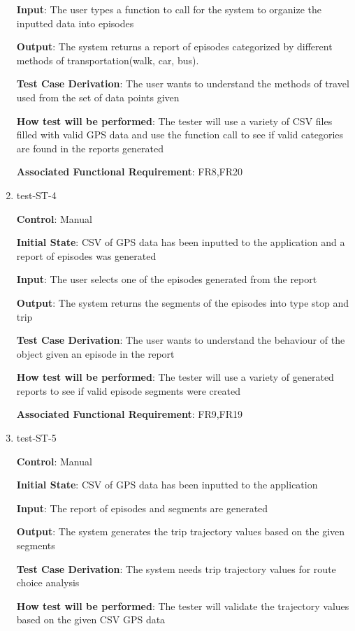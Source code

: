 \documentclass[12pt, titlepage]{article}
\begin{document}
\begin{enumerate}
\textbf{Input}: The user types a function to call for the system to organize the inputted data into episodes 
					
\textbf{Output}: The system returns a report of episodes categorized by different  methods of transportation(walk, car, bus).

\textbf{Test Case Derivation}: The user wants to understand the methods of travel used from the set of data points given

\textbf{How test will be performed}: The tester will use a variety of CSV files filled with valid GPS data and use the function call to see if valid categories are found in the reports generated


\textbf{Associated Functional Requirement}: FR8,FR20


\item{test-ST-4\\}

\textbf{Control}: Manual
					
\textbf{Initial State}: CSV of GPS data has been inputted to the application and a report of episodes was generated 
					
\textbf{Input}: The user selects one of the episodes generated from the report
					
\textbf{Output}: The system returns the segments of the episodes into type stop and trip 

\textbf{Test Case Derivation}: The user wants to understand the behaviour of the object given an episode in the report

\textbf{How test will be performed}: The tester will use a variety of generated reports to see if valid episode segments were created 


\textbf{Associated Functional Requirement}: FR9,FR19


\item{test-ST-5\\}

\textbf{Control}: Manual
					
\textbf{Initial State}: CSV of GPS data has been inputted to the application 
					
\textbf{Input}: The report of episodes and segments are generated
					
\textbf{Output}: The system generates the trip trajectory values based on the given segments

\textbf{Test Case Derivation}: The system needs trip trajectory values for route choice analysis

\textbf{How test will be performed}: The tester will validate the trajectory values based on the given CSV GPS data 


\end{enumerate}
\end{document}

